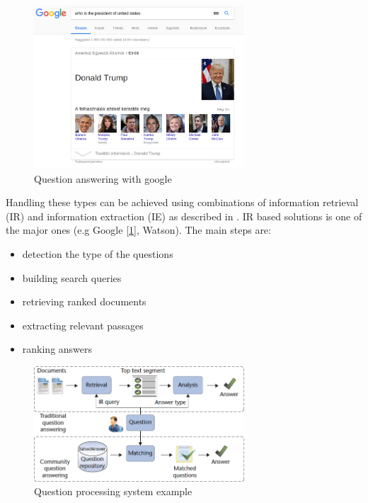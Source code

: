\begin{figure}[h]
	\centering
	\includegraphics[width=0.7\textwidth]{figures/qagoogle}
	\caption{Question answering with google}
	\label{fig:qa}
\end{figure}

Handling these types can be achieved using combinations of information retrieval (IR) and information extraction (IE) as described in \cite{Ralph:2017}.
IR based solutions is one of the major ones (e.g Google [\ref{fig:qa}], Watson). The main steps are:
\begin{itemize}
	\item detection the type of the questions
	\item building search queries
	\item retrieving ranked documents
	\item extracting relevant passages
	\item ranking answers
\end{itemize}

\begin{figure}[h]
	\centering
	\includegraphics[width=0.7\textwidth]{figures/ie}
	\caption{Question processing system example \cite{IEsystem}}
	\label{fig:ie}
\end{figure}

